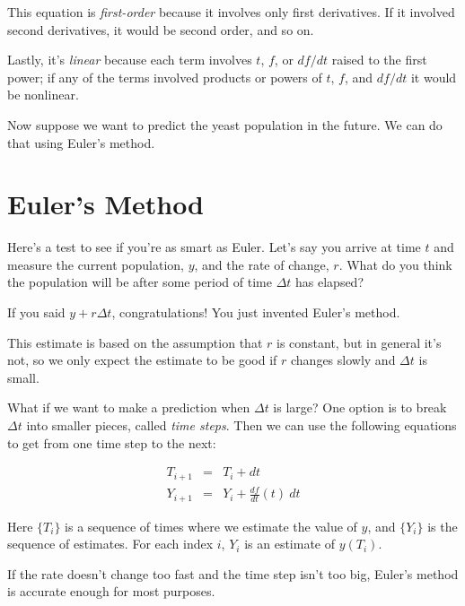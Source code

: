 
This equation is {\em first-order} because it involves only first
derivatives.  If it involved second derivatives, it would be second order,
and so on.


Lastly, it's \emph{linear} because each term involves $t$, $f$, or
$df/dt$ raised to the first power; if any of the terms involved
products or powers of $t$, $f$, and $df/dt$ it would be
nonlinear.

Now suppose we want to predict the yeast population in the future.  We can do that using Euler's method.

\section{Euler's Method}

Here's a test to see if you're as smart as Euler.  Let's say you arrive at time $t$ and measure the current population, $y$, and
the rate of change, $r$.  What do you think the population will
be after some period of time $\Delta t$ has elapsed?

If you said $y + r \Delta t$, congratulations!  You just invented
Euler's method.


This estimate is based on the assumption that $r$ is constant, but
in general it's not, so we only expect the estimate to be good if
$r$ changes slowly and $\Delta t$ is small. 

What if we want to make a prediction when $\Delta t$ is large?
One option is to break $\Delta t$ into smaller pieces, called
{\em time steps}. Then we can use the following equations to get from one time step to the next:

\begin{eqnarray}
T_{i+1} &=& T_i + dt                       \\
Y_{i+1} &=& Y_i + \frac{df}{dt}(t)~dt          
\end{eqnarray}

Here $\{T_i\}$ is a sequence of times where we estimate the value
of $y$, and $\{Y_i\}$ is the sequence of estimates.  For each
index $i$, $Y_i$ is an estimate of $y(T_i)$.


If the rate doesn't change too fast and the time step isn't
too big, Euler's method is accurate enough for most purposes.  

